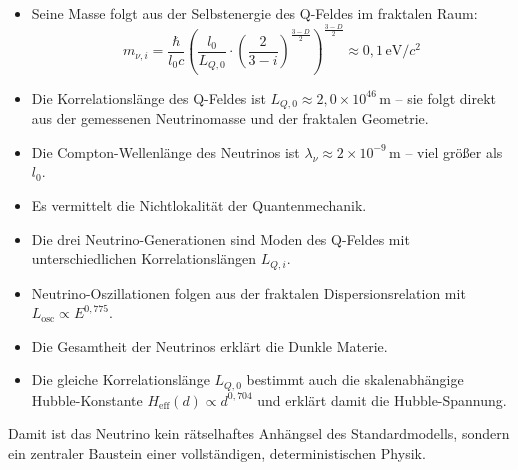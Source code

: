 \begin{itemize}
    \item Seine Masse folgt aus der Selbstenergie des Q-Feldes im fraktalen Raum:
    \[
    m_{\nu,i} = \frac{\hbar}{l_0 c} \left( \frac{l_0}{L_{Q,0}} \cdot \left(\frac{2}{3-i}\right)^{\frac{3-D}{2}} \right)^{\frac{3-D}{2}} \approx 0{,}1 \, \text{eV}/c^2
    \]
    \item Die Korrelationslänge des Q-Feldes ist \( L_{Q,0} \approx 2{,}0 \times 10^{46} \, \text{m} \) – sie folgt direkt aus der gemessenen Neutrinomasse und der fraktalen Geometrie.
    \item Die Compton-Wellenlänge des Neutrinos ist \( \lambda_\nu \approx 2 \times 10^{-9} \, \text{m} \) – viel größer als \( l_0 \).
    \item Es vermittelt die Nichtlokalität der Quantenmechanik.
    \item Die drei Neutrino-Generationen sind Moden des Q-Feldes mit unterschiedlichen Korrelationslängen \( L_{Q,i} \).
    \item Neutrino-Oszillationen folgen aus der fraktalen Dispersionsrelation mit \( L_{\text{osc}} \propto E^{0,775} \).
    \item Die Gesamtheit der Neutrinos erklärt die Dunkle Materie.
    \item Die gleiche Korrelationslänge \( L_{Q,0} \) bestimmt auch die skalenabhängige Hubble-Konstante \( H_{\text{eff}}(d) \propto d^{0,704} \) und erklärt damit die Hubble-Spannung.
\end{itemize}

Damit ist das Neutrino kein rätselhaftes Anhängsel des Standardmodells, sondern ein zentraler Baustein einer vollständigen, deterministischen Physik.